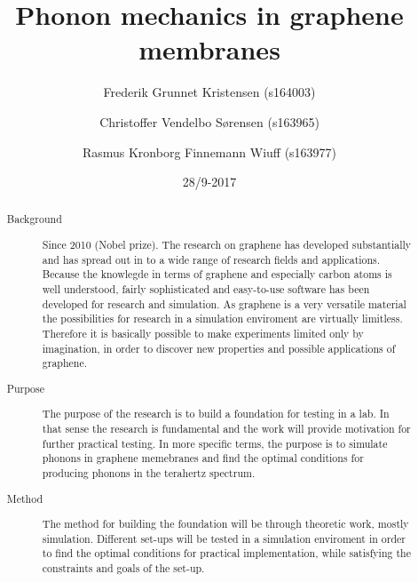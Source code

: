 




\title{Phonon mechanics in graphene membranes}
\date{28/9-2017}
\author{Frederik Grunnet Kristensen (s164003)}
\author{Christoffer Vendelbo Sørensen (s163965)}
\author{Rasmus Kronborg Finnemann Wiuff (s163977)}

\begin{abstract}
  \begin{description}
    \item[Background] Since 2010 (Nobel prize). The research on graphene has developed substantially and has spread out in to a wide range of research fields and applications. Because the knowlegde in terms of graphene and especially carbon atoms is well  understood, fairly sophisticated and easy-to-use software has been developed for research and simulation. As graphene is a very versatile material the possibilities for research in a simulation enviroment are virtually limitless. Therefore it is basically possible to make experiments limited only by imagination, in order to discover new properties and possible applications of graphene.
    \item[Purpose] The purpose of the research is to build a foundation for testing in a lab. In that sense the research is fundamental and the work will provide motivation for further practical testing. In more specific terms, the purpose is to simulate phonons in graphene memebranes and find the optimal conditions for producing phonons in the terahertz spectrum.
    \item[Method] The method for building the foundation will be through theoretic work, mostly simulation. Different set-ups will be tested in a simulation enviroment in order to find the optimal conditions for practical implementation, while satisfying the constraints and goals of the set-up.
  \end{description}
\end{abstract}


\maketitle


\thispagestyle{empty}
\setcounter{page}{1}




